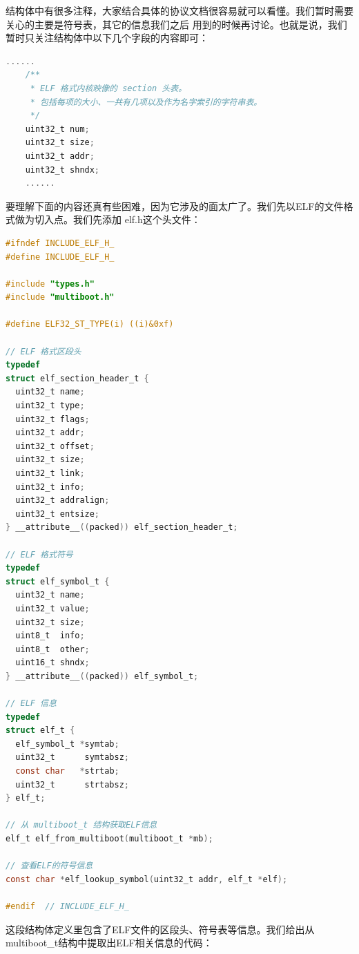 \par 结构体中有很多注释，大家结合具体的协议文档很容易就可以看懂。我们暂时需要关心的主要是符号表，其它的信息我们之后\allowbreak
用到的时候再讨论。也就是说，我们暂时只关注结构体中以下几个字段的内容即可：

\begin{lstlisting}[language = C, label = include/multiboot.h, caption = include/multiboot.h]
	......
	/**
	 * ELF 格式内核映像的 section 头表。
	 * 包括每项的大小、一共有几项以及作为名字索引的字符串表。
	 */
	uint32_t num;
	uint32_t size;
	uint32_t addr;
	uint32_t shndx;
	......
\end{lstlisting}

要理解下面的内容还真有些困难，因为它涉及的面太广了。我们先以ELF的文件格式做为切入点。我们先添加\allowbreak
elf.h这个头文件：

\begin{lstlisting}[language = C, label = include/elf.h, caption = include/elf.h]
#ifndef INCLUDE_ELF_H_
#define INCLUDE_ELF_H_

#include "types.h"
#include "multiboot.h"

#define ELF32_ST_TYPE(i) ((i)&0xf)

// ELF 格式区段头
typedef
struct elf_section_header_t {
  uint32_t name;
  uint32_t type;
  uint32_t flags;
  uint32_t addr;
  uint32_t offset;
  uint32_t size;
  uint32_t link;
  uint32_t info;
  uint32_t addralign;
  uint32_t entsize;
} __attribute__((packed)) elf_section_header_t;

// ELF 格式符号
typedef
struct elf_symbol_t {
  uint32_t name;
  uint32_t value;
  uint32_t size;
  uint8_t  info;
  uint8_t  other;
  uint16_t shndx;
} __attribute__((packed)) elf_symbol_t;

// ELF 信息
typedef
struct elf_t {
  elf_symbol_t *symtab;
  uint32_t      symtabsz;
  const char   *strtab;
  uint32_t      strtabsz;
} elf_t;

// 从 multiboot_t 结构获取ELF信息
elf_t elf_from_multiboot(multiboot_t *mb);

// 查看ELF的符号信息
const char *elf_lookup_symbol(uint32_t addr, elf_t *elf);

#endif 	// INCLUDE_ELF_H_
\end{lstlisting}

\par 这段结构体定义里包含了ELF文件的区段头、符号表等信息。我们给出从multiboot\_t结构中提取出ELF相关信息的代码：

